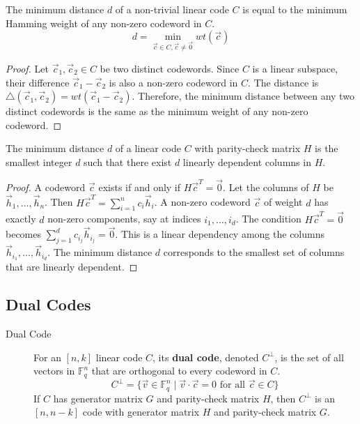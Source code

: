 \begin{theorem}
    The minimum distance $d$ of a non-trivial linear code $C$ is equal to the minimum Hamming weight of any non-zero codeword in $C$.
    \[
        d = \min_{\vec{c} \in C, \vec{c} \neq \vec{0}} wt(\vec{c})
    \]
\end{theorem}
\begin{proof}
    Let $\vec{c}_1, \vec{c}_2 \in C$ be two distinct codewords. Since $C$ is a linear subspace, their difference $\vec{c}_1 - \vec{c}_2$ is also a non-zero codeword in $C$. The distance is $\triangle(\vec{c}_1, \vec{c}_2) = wt(\vec{c}_1 - \vec{c}_2)$. Therefore, the minimum distance between any two distinct codewords is the same as the minimum weight of any non-zero codeword.
\end{proof}

\begin{theorem}
    The minimum distance $d$ of a linear code $C$ with parity-check matrix $H$ is the smallest integer $d$ such that there exist $d$ linearly dependent columns in $H$.
\end{theorem}
\begin{proof}
    A codeword $\vec{c}$ exists if and only if $H\vec{c}^T = \vec{0}$. Let the columns of $H$ be $\vec{h}_1, \dots, \vec{h}_n$. Then $H\vec{c}^T = \sum_{i=1}^n c_i \vec{h}_i$. A non-zero codeword $\vec{c}$ of weight $d$ has exactly $d$ non-zero components, say at indices $i_1, \dots, i_d$. The condition $H\vec{c}^T = \vec{0}$ becomes $\sum_{j=1}^d c_{i_j} \vec{h}_{i_j} = \vec{0}$. This is a linear dependency among the columns $\vec{h}_{i_1}, \dots, \vec{h}_{i_d}$. The minimum distance $d$ corresponds to the smallest set of columns that are linearly dependent.
\end{proof}

\subsection{Dual Codes}

\begin{description}
    \item[Dual Code] For an $[n, k]$ linear code $C$, its \textbf{dual code}, denoted $C^\perp$, is the set of all vectors in $\mathbb{F}_q^n$ that are orthogonal to every codeword in $C$.
    \[
        C^\perp = \{ \vec{v} \in \mathbb{F}_q^n \mid \vec{v} \cdot \vec{c} = 0 \text{ for all } \vec{c} \in C \}
    \]
    If $C$ has generator matrix $G$ and parity-check matrix $H$, then $C^\perp$ is an $[n, n-k]$ code with generator matrix $H$ and parity-check matrix $G$.
\end{description}

